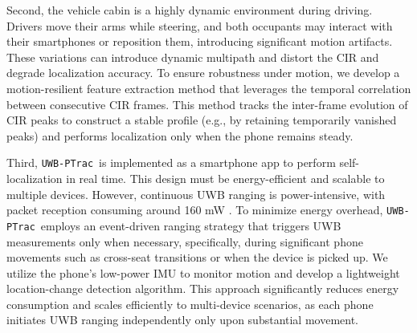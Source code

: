 \documentclass[sigconf]{acmart}
\newcommand{\edited}[1]{#1}
\newcommand{\name}{{{\tt UWB-PTrac}}}
\begin{document}
Second, the vehicle cabin is a highly dynamic environment during driving. 
%
Drivers move their arms while steering, and both occupants may interact with their smartphones or reposition them, introducing significant motion artifacts. 
%
These variations can introduce dynamic multipath and distort the CIR and degrade localization accuracy.
%
To ensure robustness under motion, we develop a motion-resilient feature extraction method that \edited{leverages the temporal correlation between consecutive CIR frames.}
%
\edited{This method tracks the inter-frame evolution of CIR peaks to construct a stable profile (e.g., by retaining temporarily vanished peaks) and performs localization only when the phone remains steady}.
%


Third, \name~is implemented as a smartphone app to perform self-localization in real time. 
%
This design must be energy-efficient and scalable to multiple devices. 
%
However, continuous UWB ranging is power-intensive, with packet reception consuming around 160 mW \cite{polonelli2022performance, Dw3000datasheet}.
%
To minimize energy overhead, \name~employs an event-driven ranging strategy that triggers UWB measurements only when necessary, specifically, during significant phone movements such as cross-seat transitions or when the device is picked up. 
%
We utilize the phone’s low-power IMU to monitor motion and develop a lightweight location-change detection algorithm. 
%
This approach significantly reduces energy consumption and scales efficiently to multi-device scenarios, as each phone initiates UWB ranging independently only upon substantial movement.
\end{document}
